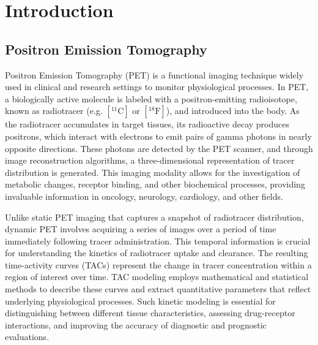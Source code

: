 \chapter{Introduction}

\section{Positron Emission Tomography }

Positron Emission Tomography (PET) is a functional imaging technique widely used in clinical and research settings to monitor physiological processes. In PET, a biologically active molecule is labeled with a positron-emitting radioisotope, known as radiotracer (e.g. $[^{11}\textrm{C}]$ or $[^{18}\textrm{F}]$), and introduced into the body. As the radiotracer accumulates in target tissues, its radioactive decay produces positrons, which interact with electrons to emit pairs of gamma photons in nearly opposite directions. These photons are detected by the PET scanner, and through image reconstruction algorithms, a three-dimensional representation of tracer distribution is generated. This imaging modality allows for the investigation of metabolic changes, receptor binding, and other biochemical processes, providing invaluable information in oncology, neurology, cardiology, and other fields.


Unlike static PET imaging that captures a snapshot of radiotracer distribution, dynamic PET involves acquiring a series of images over a period of time immediately following tracer administration. This temporal information is crucial for understanding the kinetics of radiotracer uptake and clearance. The resulting time-activity curves (TACs) represent the change in tracer concentration within a region of interest over time. TAC modeling employs mathematical and statistical methods to describe these curves and extract quantitative parameters that reflect underlying physiological processes. Such kinetic modeling is essential for distinguishing between different tissue characteristics, assessing drug-receptor interactions, and improving the accuracy of diagnostic and prognostic evaluations.

